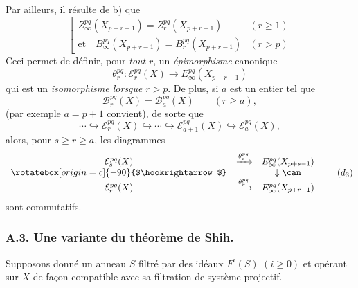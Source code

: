 Par ailleurs, il résulte de b) que
\begin{equation}
\left[
\begin{array}{ll}
Z_\infty^{pq}(X_{p+r-1})=Z_r^{pq}(X_{p+r-1})&(r\ge1)\\[3pt]
\text{et}\quad B_\infty^{pq}(X_{p+r-1})=B_r^{pq}(X_{p+r-1})&(r>p)
\end{array}
\right.
\tag{\(d_2\)}
\end{equation}
Ceci permet de définir, pour \emph{tout} \(r\), un \emph{épimorphisme} canonique
\[
\theta_r^{pq}:\mathcal{E}_r^{pq}(X)\longrightarrow E_\infty^{pq}(X_{p+r-1})
\]
qui est un \emph{isomorphisme lorsque} \(r>p\). De plus, si \(a\) est un entier tel que
\[
\mathcal{B}_r^{pq}(X)=\mathcal{B}_a^{pq}(X)\qquad(r\ge a),
\]
(par exemple \(a=p+1\) convient), de sorte que
\begin{equation}
\cdots\hookrightarrow\mathcal{E}_r^{pq}(X)\hookrightarrow\cdots\hookrightarrow
\mathcal{E}_{a+1}^{pq}(X)\hookrightarrow\mathcal{E}_a^{pq}(X),
\tag{S bis}
\end{equation}
alors, pour \(s\ge r\ge a\), les diagrammes
\begin{equation}
\begin{array}{ccc}
\mathcal{E}_s^{pq}(X)&\xrightarrow{\theta_s^{pq}}&E_\infty^{pq}(X_{p+s-1})\\
\rotatebox[origin=c]{-90}{$\hookrightarrow$}&&\downarrow\can\\
\mathcal{E}_r^{pq}(X)&\xrightarrow{\theta_r^{pq}}&E_\infty^{pq}(X_{p+r-1})
\end{array}
\tag{\(d_3\)}
\end{equation}
sont commutatifs.

\subsubsection*{A.3. Une variante du théorème de Shih.}
Supposons donné un anneau \(S\) filtré par des idéaux \(F^i(S)\) \((i\ge0)\) et opérant sur \(X\) de façon compatible avec sa filtration de système projectif.

